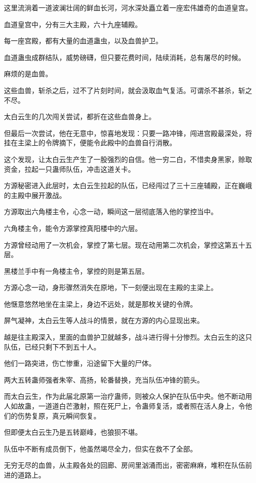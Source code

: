 \begin{this_body}
这里流淌着一道波澜壮阔的鲜血长河，河水深处矗立着一座宏伟雄奇的血道皇宫。

血道皇宫中，分有三大主殿，六十九座辅殿。

每一座宫殿，都有大量的血道蛊虫，以及血兽护卫。

血道蛊虫成群结队，威势磅礴，但只要花费时间，陆续消耗，总有屠尽的时候。

麻烦的是血兽。

这些血兽，斩杀之后，过不了片刻时间，就会汲取血气复活。可谓杀不甚杀，斩之不尽。

太白云生的几次闯关尝试，都折在这些血兽身上。

但最后一次尝试，他在无意中，惊喜地发现：只要一路冲锋，闯进宫殿最深处，将挂在主梁上的令牌摘下，便能令此殿中的血兽自行消散。

这个发现，让太白云生产生了一股强烈的自信。他一穷二白，不惜卖身黑家，赊取资金，拉起一只蛊师队伍，冲击这道关卡。

方源秘密进入此层时，太白云生拉起的队伍，已经闯过了三十三座辅殿，正在巍峨的主殿中展开激战。

方源取出六角楼主令，心念一动，瞬间这一层彻底落入他的掌控当中。

六角楼主令，能令方源掌控真阳楼中的六层。

方源曾经动用了一次机会，掌控了第七层。现在动用第二次机会，掌控这第五十五层。

黑楼兰手中有一角楼主令，掌控的则是第五层。

方源心念一动，身形骤然消失在原地，下一刻便出现在主殿的主梁上。

他惬意悠然地坐在主梁上，身边不远处，就是那枚关键的令牌。

屏气凝神，太白云生等人战斗的情景，就在方源的内心显现出来。

越是往主殿深入，里面的血兽护卫就越多，战斗进行得十分惨烈。太白云生的这只队伍，已经只剩下不到五十人。

他们一路突进，伤亡惨重，沿途留下大量的尸体。

两大五转蛊师强者朱宰、高扬，轮番替换，充当队伍冲锋的箭头。

而太白云生，作为此届北原第一治疗蛊师，则被众人保护在队伍中央。他不断动用人如故蛊，一道道白芒激射，照在死尸上，令蛊师复活，或者照在活人身上，令他们的伤势复原，真元瞬间恢复。

但即便太白云生乃是五转巅峰，也狼狈不堪。

队伍中不断有成员倒下，他虽然竭尽全力，但实在救不了全部。

无穷无尽的血兽，从主殿各处的回廊、房间里汹涌而出，密密麻麻，堆积在队伍前进的道路上。


\end{this_body}
